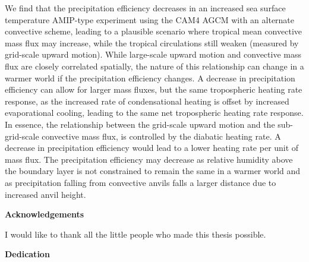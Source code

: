 We find that the precipitation efficiency decreases in an increased sea surface temperature AMIP-type experiment using the CAM4 AGCM with an alternate convective scheme, leading to a plausible scenario where tropical mean convective mass flux may increase, while the tropical circulations still weaken (measured by grid-scale upward motion). While large-scale upward motion and convective mass flux are closely correlated spatially, the nature of this relationship can change in a warmer world if the precipitation efficiency changes. A decrease in precipitation efficiency can allow for larger mass fluxes, but the same tropospheric heating rate response, as the increased rate of condensational heating is offset by increased evaporational cooling, leading to the same net tropospheric heating rate response. In essence, the relationship between the grid-scale upward motion and the sub-grid-scale convective mass flux, is controlled by the diabatic heating rate. A decrease in precipitation efficiency would lead to a lower heating rate per unit of mass flux. The precipitation efficiency may decrease as relative humidity above the boundary layer is not constrained to remain the same in a warmer world and as precipitation falling from convective anvils falls a larger distance due to increased anvil height. 
\cleardoublepage


\begin{center}\textbf{Acknowledgements}\end{center}

I would like to thank all the little people who made this thesis possible.
\cleardoublepage


\begin{center}\textbf{Dedication}\end{center}

\cleardoublepage

\renewcommand\contentsname{Table of Contents}
\tableofcontents
\cleardoublepage
{}    %

\listoftables
\cleardoublepage
{}		%

\listoffigures
\cleardoublepage
{}		%

\cleardoublepage
{}		%



